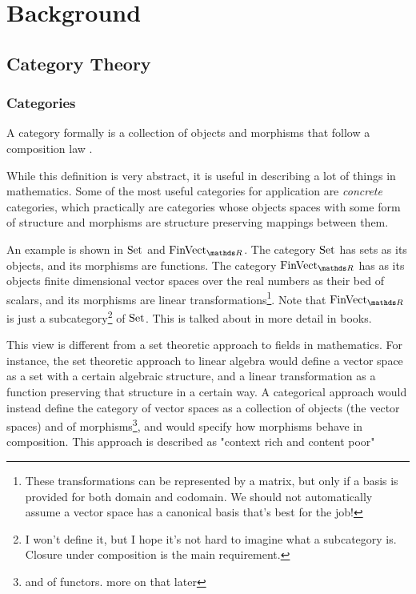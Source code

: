 \chapter{Background}
\section{Category Theory}
\subsection{Categories}

A category formally is a collection of objects and morphisms that follow a composition law \cite{context}. 

While this definition is very abstract, it is useful in describing a lot of things  in mathematics.
Some of the most useful categories for application are \emph{concrete} categories, which practically are categories whose objects spaces with some form of structure and morphisms are structure preserving mappings between them.



An example is shown in $\mathrm{Set}$ and $\FinVect$.
The category $\mathrm{Set}$ has sets as its objects, and its morphisms are functions.
The category $\FinVect$ has as its objects finite dimensional vector spaces over the real numbers as their bed of scalars, and its morphisms are linear transformations\footnote{These transformations can be represented by a matrix, but only if a basis is provided for both domain and codomain. We should not automatically assume a vector space has a canonical basis that's best for the job!}.
Note that $\FinVect$ is just a subcategory\footnote{I won't define it, but I hope it's not hard to imagine what a subcategory is. Closure under composition is the main requirement.} of $\mathrm{Set}$. This is talked about in more detail in books.

This view is different from a set theoretic approach to fields in mathematics.
For instance, the set theoretic approach to linear algebra would define a vector space as a set with a certain algebraic structure, and a linear transformation as a function preserving that structure in a certain way.
A categorical approach would instead define the category of vector spaces as a collection of objects (the vector spaces) and of morphisms\footnote{and of functors. more on that later}, and would specify how morphisms behave in composition.
This approach is described as "context rich and content poor"

